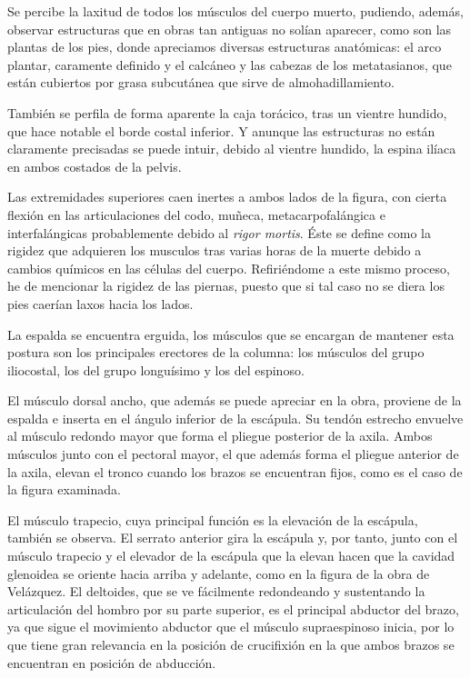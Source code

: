 Se percibe la laxitud de todos los músculos del cuerpo muerto, pudiendo, además, observar estructuras que en obras tan antiguas no solían aparecer, como son las plantas de los pies, donde apreciamos diversas estructuras anatómicas: el arco plantar, caramente definido y el calcáneo y las cabezas de los metatasianos, que están cubiertos por grasa subcutánea que sirve de almohadillamiento.

También se perfila de forma aparente la caja torácico, tras un vientre hundido, que hace notable el borde costal inferior. Y anunque las estructuras no están claramente precisadas se puede intuir, debido al vientre hundido, la espina ilíaca en ambos costados de la pelvis.

Las extremidades superiores caen inertes a ambos lados de la figura, con cierta flexión en las articulaciones del codo, muñeca, metacarpofalángica e interfalángicas probablemente debido al \textit{rigor mortis}. Éste se define como la rigidez que adquieren los musculos tras varias horas de la muerte debido a cambios químicos en las células del cuerpo. Refiriéndome a este mismo proceso, he de mencionar la rigidez de las piernas, puesto que si tal caso no se diera los pies caerían laxos hacia los lados.



La espalda se encuentra erguida, los músculos que se encargan de mantener esta postura son los principales erectores de la columna: los músculos del grupo iliocostal, los del grupo longuísimo y los del espinoso.

El músculo dorsal ancho, que además se puede apreciar en la obra, proviene de la espalda e inserta en el ángulo inferior de la escápula. Su tendón estrecho envuelve al músculo redondo mayor que forma el pliegue posterior de la axila. Ambos músculos junto con el pectoral mayor, el que además forma el pliegue anterior de la axila, elevan el tronco cuando los brazos se encuentran fijos, como es el caso de la figura examinada.

El músculo trapecio, cuya principal función es la elevación de la escápula, también se observa. El serrato anterior gira la escápula y, por tanto, junto con el músculo trapecio y el elevador de la escápula que la elevan hacen que la cavidad glenoidea se oriente hacia arriba y adelante, como en la figura de la obra de Velázquez.
El deltoides, que se ve fácilmente redondeando y sustentando la articulación del hombro por su parte superior, es el principal abductor del brazo, ya que sigue el movimiento abductor que el músculo supraespinoso inicia, por lo que tiene gran relevancia en la posición de crucifixión en la que ambos brazos se encuentran en posición de abducción.


